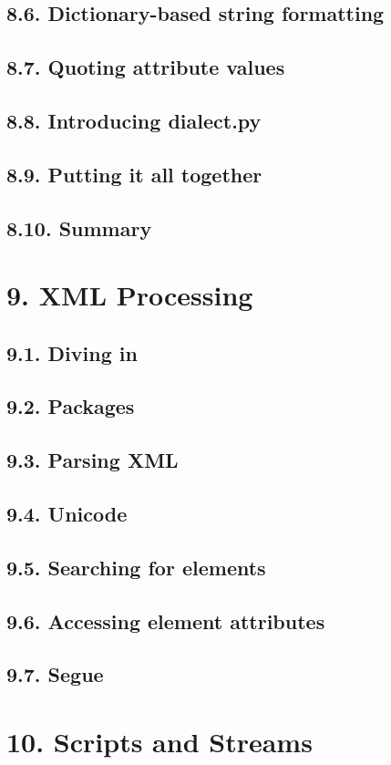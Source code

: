\documentclass[oneside,12pt]{book}
\begin{document}
\section{8.6. Dictionary-based string formatting}
\section{8.7. Quoting attribute values}
\section{8.8. Introducing dialect.py}
\section{8.9. Putting it all together}
\section{8.10. Summary}
   
\chapter{9. XML Processing}
\section{9.1. Diving in}
\section{9.2. Packages}
\section{9.3. Parsing XML}
\section{9.4. Unicode}
\section{9.5. Searching for elements}
\section{9.6. Accessing element attributes}
\section{9.7. Segue}
   
\chapter{10. Scripts and Streams}
\end{document}
